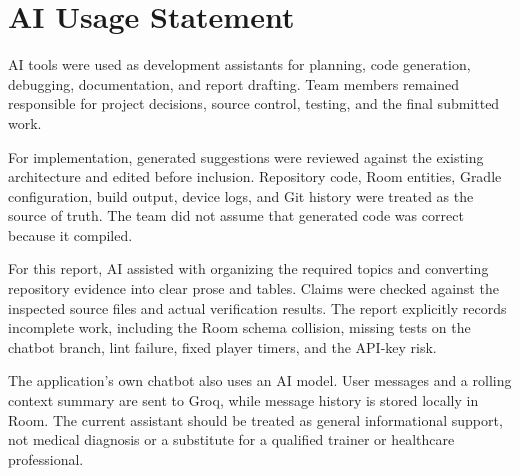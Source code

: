 \section{AI Usage Statement}

AI tools were used as development assistants for planning, code generation, debugging, documentation, and report drafting. Team members remained responsible for project decisions, source control, testing, and the final submitted work.

For implementation, generated suggestions were reviewed against the existing architecture and edited before inclusion. Repository code, Room entities, Gradle configuration, build output, device logs, and Git history were treated as the source of truth. The team did not assume that generated code was correct because it compiled.

For this report, AI assisted with organizing the required topics and converting repository evidence into clear prose and tables. Claims were checked against the inspected source files and actual verification results. The report explicitly records incomplete work, including the Room schema collision, missing tests on the chatbot branch, lint failure, fixed player timers, and the API-key risk.

The application's own chatbot also uses an AI model. User messages and a rolling context summary are sent to Groq, while message history is stored locally in Room. The current assistant should be treated as general informational support, not medical diagnosis or a substitute for a qualified trainer or healthcare professional.
